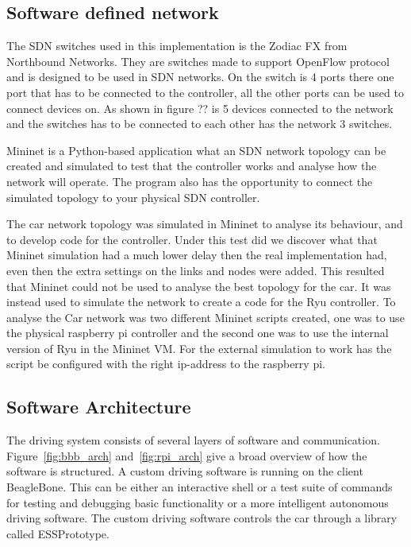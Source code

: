 \documentclass[11pt, titlepage]{article} %
\begin{document}
\subsection{Software defined network}

The SDN switches used in this implementation is the Zodiac FX from Northbound Networks. They are switches made to support OpenFlow protocol and is designed to be used in SDN networks. On the switch is 4 ports there one port that has to be connected to the controller, all the other ports can be used to connect devices on. As shown in figure ?? is 5 devices connected to the network and the switches has to be connected to each other has the network 3 switches. 

Mininet is a Python-based application what an SDN network topology can be created and simulated to test that the controller works and analyse how the network will operate. The program also has the opportunity to connect the simulated topology to your physical SDN controller. 

The car network topology was simulated in Mininet to analyse its behaviour, and to develop code for the controller. Under this test did we discover what that Mininet simulation had a much lower delay then the real implementation had, even then the extra settings on the links and nodes were added. This resulted that Mininet could not be used to analyse the best topology for the car. It was instead used to simulate the network to create a code for the Ryu controller. To analyse the Car network was two different Mininet scripts created, one was to use the physical raspberry pi controller and the second one was to use the internal version of Ryu in the Mininet VM. For the external simulation to work has the script be configured with the right ip-address to the raspberry pi. 

\subsection{Software Architecture}
The driving system consists of several layers of software and communication. Figure~\ref{fig:bbb_arch}
and~\ref{fig:rpi_arch} give a broad overview of how the software is structured. A custom driving software
is running on the client BeagleBone. This can be either an interactive shell or a test suite
of commands for testing and debugging basic functionality or a more intelligent autonomous driving
software. The custom driving software controls the car through a library called ESSPrototype.
\end{document}
